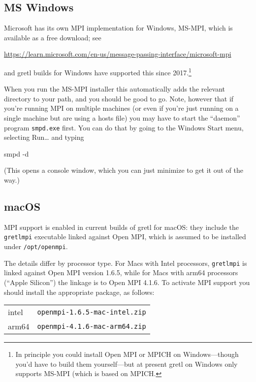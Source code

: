 \documentclass{article}
\begin{document}
\subsection{MS Windows}

Microsoft has its own MPI implementation for Windows, \textsf{MS-MPI},
which is available as a free download; see

\url{https://learn.microsoft.com/en-us/message-passing-interface/microsoft-mpi}

and gretl builds for Windows have supported this since
2017.\footnote{In principle you could install \textsf{Open MPI} or
  \textsf{MPICH} on Windows---though you'd have to build them
  yourself---but at present gretl on Windows only supports
  \textsf{MS-MPI} (which is based on \textsf{MPICH}.}

When you run the \textsf{MS-MPI} installer this automatically adds the
relevant directory to your path, and you should be good to go. Note,
however that if you're running MPI on multiple machines (or even if
you're just running on a single machine but are using a hosts file)
you may have to start the ``daemon'' program \texttt{smpd.exe}
first. You can do that by going to the Windows Start menu, selecting
\textsf{Run\dots{}} and typing
\begin{code}
smpd -d
\end{code}
(This opens a console window, which you can just minimize to get it
out of the way.)

\subsection{macOS}

MPI support is enabled in current builds of gretl for macOS: they
include the \texttt{gretlmpi} executable linked against \textsf{Open
  MPI}, which is assumed to be installed under
\texttt{/opt/openmpi}.

The details differ by processor type. For Macs with Intel processors,
\texttt{gretlmpi} is linked against \textsf{Open MPI} version 1.6.5, while
for Macs with arm64 processors (``Apple Silicon'') the linkage is to
\textsf{Open MPI} 4.1.6. To activate MPI support you should install the
appropriate package, as follows:

\begin{center}
\begin{tabular}{ll}
  intel & \texttt{openmpi-1.6.5-mac-intel.zip} \\
  arm64 & \texttt{openmpi-4.1.6-mac-arm64.zip}
\end{tabular}
\end{center}
\end{document}
